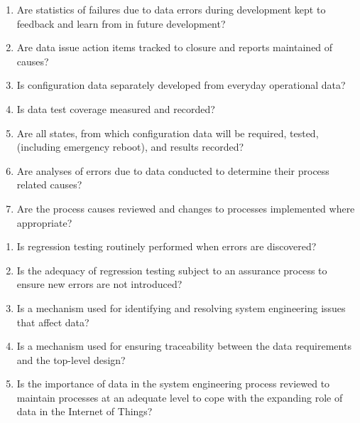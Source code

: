 \begin{enumerate}
  \item Are statistics of failures due to data errors during development kept to feedback and learn from in future development?
  \item Are data issue action items tracked to closure and reports maintained of causes?
  \item Is \gls{configuration data} separately developed from everyday operational data?
  \item Is data test coverage measured and recorded?
  \item Are all states, from which \gls{configuration data} will be required, tested, (including emergency reboot), and results recorded?
  \item Are analyses of errors due to data conducted to determine their process related causes?
  \item Are the process causes reviewed and changes to processes implemented where appropriate?
\end{enumerate}

\begin{enumerate}
  \item Is regression testing routinely performed when errors are discovered?
  \item Is the adequacy of regression testing subject to an assurance process to ensure new errors are not introduced?
  \item Is a mechanism used for identifying and resolving system engineering issues that affect data?
  \item Is a mechanism used for ensuring traceability between the data requirements and the top-level design?
  \item Is the importance of data in the system engineering process reviewed to maintain processes at an adequate level to cope with the expanding role of data in the Internet of Things? 
\end{enumerate}
